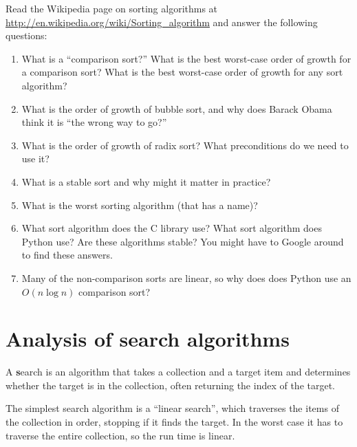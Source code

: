 \documentclass[
DIV=11,
fontsize=12,
twoside,
headinclude=false,
titlepage=firstiscover,
abstract=true,
headsepline=true,
footsepline=true,
chapterprefix=true, %
headings=big,
bibliography=totoc,%
captions=tableheading
]{scrbook}
\theoremstyle{definition}
\begin{document}
\begin{exercise}
\normalfont

Read the Wikipedia page on sorting algorithms at
\url{http://en.wikipedia.org/wiki/Sorting_algorithm} and answer
the following questions:

\begin{enumerate}

\item What is a ``comparison sort?'' What is the best worst-case order
  of growth for a comparison sort?  What is the best worst-case order
  of growth for any sort algorithm?

\item What is the order of growth of bubble sort, and why does Barack
  Obama think it is ``the wrong way to go?''

\item What is the order of growth of radix sort?  What preconditions
  do we need to use it?

\item What is a stable sort and why might it matter in practice?

\item What is the worst sorting algorithm (that has a name)?

\item What sort algorithm does the C library use?  What sort algorithm
  does Python use?  Are these algorithms stable?  You might have to
  Google around to find these answers.

\item Many of the non-comparison sorts are linear, so why does does
  Python use an $O(n \log n)$ comparison sort?

\end{enumerate}

\end{exercise}


\section{Analysis of search algorithms}

A {\textbf search} is an algorithm that takes a collection and a target
item and determines whether the target is in the collection, often
returning the index of the target.

The simplest search algorithm is a ``linear search'', which traverses
the items of the collection in order, stopping if it finds the target.
In the worst case it has to traverse the entire collection, so the run
time is linear.
\end{document}
